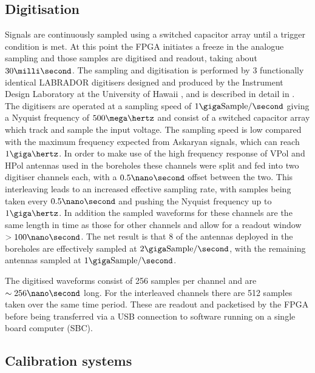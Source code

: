 \subsection{Digitisation}
\label{sec:ara-detector:TestBed:Digitisation}

Signals are continuously sampled using a switched capacitor array until a trigger condition is met. At this point the FPGA initiates a freeze in the analogue sampling and those samples are digitised and readout, taking about $30 \milli \second$. The sampling and digitisation is performed by 3 functionally identical LABRADOR digitisers designed and produced by the Instrument Design Laboratory at the University of Hawaii \cite{Varner2007447}, and is described in detail in . The digitisers are operated at a sampling speed of $1 \giga \mbox{Sample} /\second$ giving a Nyquist frequency of $500 \mega \hertz$ and consist of a switched capacitor array which track and sample the input voltage. The sampling speed is low compared with the maximum frequency expected from Askaryan signals, which can reach $1 \giga \hertz$. In order to make use of the high frequency response of VPol and HPol antennas used in the boreholes these channels were split and fed into two digitiser channels each, with a $0.5 \nano \second$ offset between the two. This interleaving leads to an increased effective sampling rate, with samples being taken every $0.5 \nano \second$ and pushing the Nyquist frequency up to $1 \giga \hertz$. In addition the sampled waveforms for these channels are the same length in time as those for other channels and allow for a readout window $> 100 \nano \second$. The net result is that 8 of the antennas deployed in the boreholes are effectively sampled at $2 \giga \mbox{Sample} /\second$, with the remaining antennas sampled at $1 \giga \mbox{Sample} /\second$.

The digitised waveforms consist of 256 samples per channel and are $\sim 256 \nano \second$ long. For the interleaved channels there are 512 samples taken over the same time period. These are readout and packetised by the FPGA before being transferred via a USB connection to software running on a single board computer (SBC).

\subsection{Calibration systems}
\label{sec:ara-detector:TestBed:Calibration-systems}

